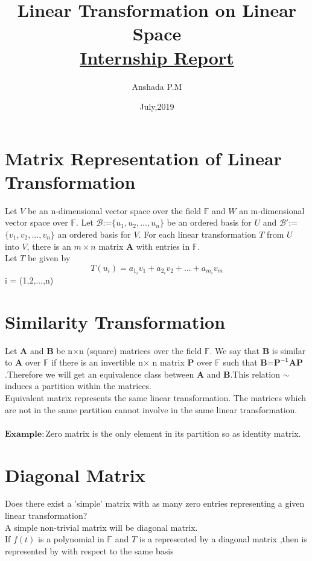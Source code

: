 \documentclass[12pt]{article}
\theoremstyle{definition}
\begin{document}
	\title{\textbf{Linear Transformation on Linear Space} \\
		\large\underline{Internship Report} 
	}
	\author{Anshada P.M}
	\date{July,2019}
	\maketitle
	\section{Matrix Representation of Linear Transformation}
	 Let $V$ be an n-dimensional vector space over the field $ \mathbb{F}$ and $W$ an m-dimensional vector space over $\mathbb{F}$. Let $\mathcal{B}$:=$\{u_1,u_2,...,u_n\}$ be an ordered basis for $U$ and $\mathcal{B\prime}$:=$\{v_1,v_2,...,v_n\}$ an ordered basis for $V$. For each linear transformation $T$ from $U$ into $V$, there is an $ m\times n$ matrix $\mathbf{A}$ with entries in $\mathbb{F}$.\\
	 Let $T$ be given by
 	 $$ T(u_{i})=a_{1_{i}}v_1+a_{2_{i}}v_2+...+a_{m_{i}}v_m $$
	  i = (1,2,...,n)\\
	  
	  \section{Similarity Transformation}
	  Let $\mathbf{A}$ and $\mathbf{B}$ be n$\times$n (square) matrices over the field $\mathbb{F}$. We say that $\mathbf{B}$ is similar to $\mathbf{A}$ over $\mathbb{F}$ if there is an invertible n$\times$ n matrix $\mathbf{P}$ over $\mathbb{F}$ such that  $\mathbf{B}$=$\mathbf{P^{-1}}\mathbf{A}\mathbf{P}$.Therefore we will get an equivalence class between $\mathbf{A}$ and $\mathbf{B}$.This relation $\sim$ induces a partition within the matrices.\\
	  Equivalent matrix represents the same linear transformation. The matrices which are not in the same partition cannot involve in the same linear transformation.\\
	  \\
	  $\mathbf{Example:}$Zero matrix is the only element in its partition so as identity matrix.
	  \section{Diagonal Matrix}
	  Does there exist a 'simple' matrix with as many zero entries representing a given linear transformation?\\
	  A simple non-trivial matrix will be diagonal matrix.\\
	  If $f(t)$ is a polynomial in $\mathbb{F}$ and $T$ is a represented by a diagonal matrix ,then is represented by with respect to the same basis
	  
\end{document}
